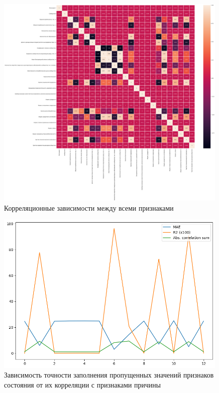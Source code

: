 \begin{figure}
	\begin{center}
		\includegraphics[width=\textwidth]{images/2.png}
	\end{center}
	\caption{Корреляционные зависимости между всеми признаками}
	\label{img:2}
\end{figure}

\begin{figure}
	\begin{center}
		\includegraphics[width=\textwidth]{images/3.png}
	\end{center}
	\caption{Зависимость точности заполнения пропущенных значений признаков состояния от их корреляции с признаками причины}
	\label{img:3}
\end{figure}

\clearpage
